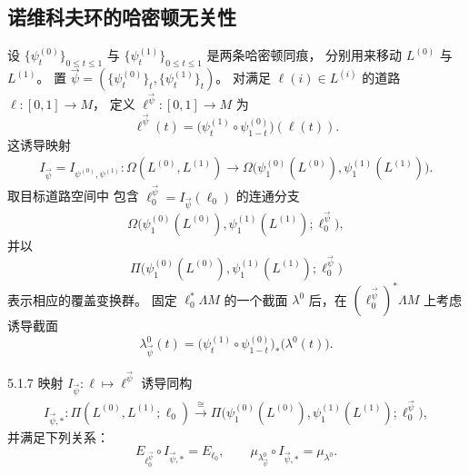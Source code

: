 
\subsection{诺维科夫环的哈密顿无关性}
\label{subsec:5-1-2}

设 $\{\psi_t^{(0)}\}_{0\leq t\leq1}$
与 $\{\psi_t^{(1)}\}_{0\leq t\leq1}$
是两条哈密顿同痕，
分别用来移动 $L^{(0)}$ 与 $L^{(1)}$。
置
$\vec\psi=
(\{\psi_t^{(0)}\}_t,\{\psi_t^{(1)}\}_t)$。
对满足 $\ell(i)\in L^{(i)}$ 的道路
$\ell:[0,1]\to M$，
定义 $\ell^{\vec\psi}:[0,1]\to M$ 为
\[
\ell^{\vec\psi}(t)
=\bigl(\psi_t^{(1)}\circ\psi_{1-t}^{(0)}\bigr)
(\ell(t)).
\]
这诱导映射
\[
\begin{aligned}
I_{\vec\psi}
=I_{\psi^{(0)},\psi^{(1)}}:
\Omega(L^{(0)},L^{(1)})
\longrightarrow
\Omega\bigl(
\psi_1^{(0)}(L^{(0)}),
\psi_1^{(1)}(L^{(1)})\bigr).
\end{aligned}
\]
取目标道路空间中
包含
$\ell_0^{\vec\psi}=I_{\vec\psi}(\ell_0)$
的连通分支
\[
\Omega\bigl(
\psi_1^{(0)}(L^{(0)}),
\psi_1^{(1)}(L^{(1)});
\ell_0^{\vec\psi}\bigr),
\]
并以
\[
\Pi\bigl(
\psi_1^{(0)}(L^{(0)}),
\psi_1^{(1)}(L^{(1)});
\ell_0^{\vec\psi}\bigr)
\]
表示相应的覆盖变换群。
固定 $\ell_0^*\Lambda M$ 的一个截面
$\lambda^0$ 后，在
$(\ell_0^{\vec\psi})^*\Lambda M$
上考虑诱导截面
\[
\lambda^0_{\vec\psi}(t)
=\bigl(\psi_t^{(1)}\circ
       \psi_{1-t}^{(0)}\bigr)_*
\bigl(\lambda^0(t)\bigr).
\]

\begin{proposition}{5.1.7}\label{prop:5-1-7}
映射 $I_{\vec\psi}:\ell\mapsto\ell^{\vec\psi}$
诱导同构
\[
\begin{aligned}
I_{\vec\psi,*}:
\Pi(L^{(0)},L^{(1)};\ell_0)
\xrightarrow{\ \cong\ }
\Pi\bigl(
\psi_1^{(0)}(L^{(0)}),
\psi_1^{(1)}(L^{(1)});
\ell_0^{\vec\psi}\bigr),
\end{aligned}
\]
并满足下列关系：
\[
E_{\ell_0^{\vec\psi}}\circ I_{\vec\psi,*}
=E_{\ell_0},
\qquad
\mu_{\lambda^0_{\vec\psi}}\circ I_{\vec\psi,*}
=\mu_{\lambda^0}.
\]
\end{proposition}

